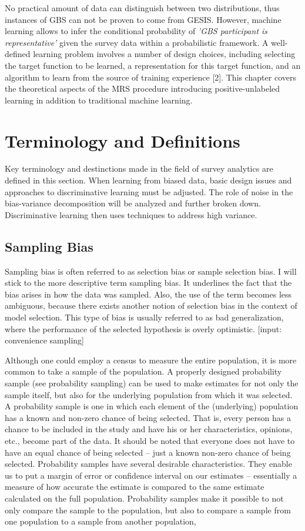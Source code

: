
No practical amount of data can distinguish between two distributions, thus instances of GBS can not be proven to come from GESIS. However, machine learning allows to infer the conditional probability of \textit{'GBS participant is representative'} given the survey data within a probabilistic framework. A well-defined learning problem involves a number of design choices, including selecting the target function to be learned, a representation for this target function, and an algorithm to learn from the source of training experience [2]. This chapter covers the theoretical aspects of the MRS procedure introducing positive-unlabeled learning in addition to traditional machine learning.

\section{Terminology and Definitions}

Key terminology and destinctions made in the field of survey analytics are defined in this section. When learning from biased data, basic design issues and approaches to discriminative learning must be adjusted. The role of noise in the bias-variance decomposition will be analyzed and further broken down. Discriminative learning then uses techniques to address high variance.

\subsection{Sampling Bias}

Sampling bias is often referred to as selection bias or sample selection bias. I will stick to the more descriptive term sampling bias. It underlines the fact that the bias arises in how the data was sampled. Also, the use of the term becomes less ambiguous, because there exists another notion of selection bias in the context of model selection. This type of bias is usually referred to as bad generalization, where the performance of the selected hypothesis is overly optimistic. [input: convenience sampling]

Although one could employ a census to measure the entire population, it is more common to take a sample of the population. A properly designed probability sample (see probability sampling) can be used to make estimates for not only the sample itself, but also for the underlying population from which it was selected. A probability sample is one in which each element of the (underlying) population has a known and non-zero chance of being selected. That is, every person has a chance to be included in the study and have his or her characteristics, opinions, etc., become part of the data. It should be noted that everyone does not have to have an equal chance of being selected – just a known non-zero chance of being selected. 
Probability samples have several desirable characteristics. They enable us to put a margin of error or confidence interval on our estimates – essentially a measure of how accurate the estimate is compared to the same estimate calculated on the full population. Probability samples make it possible to not only compare the sample to the population, but also to compare a sample from one population to a sample from another population,

